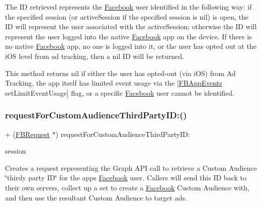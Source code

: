 The ID retrieved represents the \hyperlink{interfaceFacebook}{Facebook} user identified in the following way\+: if the specified session (or active\+Session if the specified session is {\ttfamily nil}) is open, the ID will represent the user associated with the active\+Session; otherwise the ID will represent the user logged into the native \hyperlink{interfaceFacebook}{Facebook} app on the device. If there is no native \hyperlink{interfaceFacebook}{Facebook} app, no one is logged into it, or the user has opted out at the i\+OS level from ad tracking, then a {\ttfamily nil} ID will be returned.

This method returns {\ttfamily nil} if either the user has opted-\/out (via i\+OS) from Ad Tracking, the app itself has limited event usage via the {\ttfamily \mbox{[}\hyperlink{interfaceFBAppEvents}{F\+B\+App\+Events} set\+Limit\+Event\+Usage\mbox{]}} flag, or a specific \hyperlink{interfaceFacebook}{Facebook} user cannot be identified. \mbox{\label{interfaceFBRequest_a17f11f5dad042b4109b3a001300d6916}} 
\subsubsection{\texorpdfstring{request\+For\+Custom\+Audience\+Third\+Party\+I\+D\+:()}{requestForCustomAudienceThirdPartyID:()}\hspace{0.1cm}{\footnotesize\ttfamily [4/5]}}
{\footnotesize\ttfamily + (\hyperlink{interfaceFBRequest}{F\+B\+Request} $\ast$) request\+For\+Custom\+Audience\+Third\+Party\+I\+D\+: \begin{DoxyParamCaption}\item[{(\hyperlink{interfaceFBSession}{F\+B\+Session} $\ast$)}]{session }\end{DoxyParamCaption}}

Creates a request representing the Graph A\+PI call to retrieve a Custom Audience \char`\"{}thirdy party I\+D\char`\"{} for the app\textquotesingle{}s \hyperlink{interfaceFacebook}{Facebook} user. Callers will send this ID back to their own servers, collect up a set to create a \hyperlink{interfaceFacebook}{Facebook} Custom Audience with, and then use the resultant Custom Audience to target ads.


